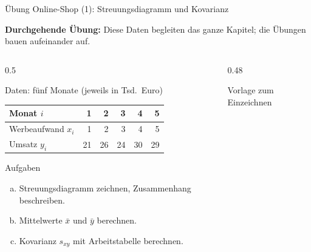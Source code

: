\documentclass[aspectratio=169,11pt]{beamer}
\newcommand{\durchgehend}[1]{{\footnotesize\color{hsbibluedark}\textbf{Durchgehende Übung:} #1\par}\smallskip}
\begin{document}
\begin{frame}{Übung Online-Shop (1): Streuungsdiagramm und Kovarianz}
  \durchgehend{Diese Daten begleiten das ganze Kapitel; die Übungen bauen aufeinander auf.}

  \begin{columns}[T]
    \begin{column}{0.5\textwidth}
      \small
      \begin{block}{Daten: fünf Monate (jeweils in Tsd.~Euro)}
        \begin{center}
          \renewcommand{\arraystretch}{1.05}
          \begin{tabular}{l*{5}{r}}
            \toprule
            Monat $i$          & 1  & 2  & 3  & 4  & 5  \\
            \midrule
            Werbeaufwand $x_i$ & 1  & 2  & 3  & 4  & 5  \\
            Umsatz $y_i$       & 21 & 26 & 24 & 30 & 29 \\
            \bottomrule
          \end{tabular}
        \end{center}
      \end{block}
      \begin{exampleblock}{Aufgaben}
        \begin{enumerate}[a)]
          \item Streuungsdiagramm zeichnen, Zusammenhang beschreiben.
          \item Mittelwerte $\bar{x}$ und $\bar{y}$ berechnen.
          \item Kovarianz $s_{xy}$ mit Arbeitstabelle berechnen.
        \end{enumerate}
      \end{exampleblock}
    \end{column}
    \begin{column}{0.48\textwidth}
      \begin{center}\footnotesize Vorlage zum Einzeichnen\end{center}
    \end{column}
  \end{columns}
\end{frame}
\end{document}
